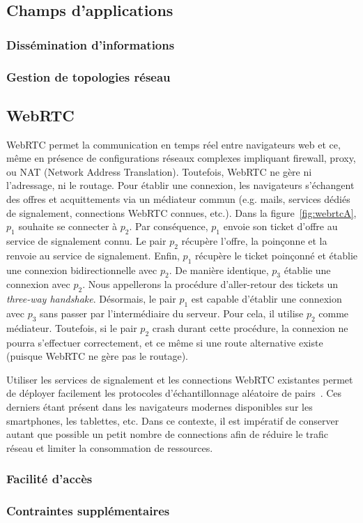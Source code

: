 \subsection{Champs d'applications}

\subsubsection{Dissémination d'informations}
\subsubsection{Gestion de topologies réseau}

\subsection{WebRTC}

WebRTC permet la communication en temps réel entre navigateurs web et ce, même
en présence de configurations réseaux complexes impliquant firewall, proxy, ou
NAT (Network Address Translation). Toutefois, WebRTC ne gère ni l'adressage, ni
le routage. Pour établir une connexion, les navigateurs s'échangent des offres
et acquittements via un médiateur commun (e.g. mails, services dédiés de
signalement, connections WebRTC connues, etc.). Dans la
figure~\ref{fig:webrtcA}, $p_1$ souhaite se connecter à $p_2$. Par conséquence,
$p_1$ envoie son ticket d'offre au service de signalement connu. Le pair $p_2$
récupère l'offre, la poinçonne et la renvoie au service de signalement. Enfin,
$p_1$ récupère le ticket poinçonné et établie une connexion bidirectionnelle
avec $p_2$. De manière identique, $p_3$ établie une connexion avec $p_2$. Nous
appellerons la procédure d'aller-retour des tickets un \emph{three-way
  handshake}. Désormais, le pair $p_1$ est capable d'établir une connexion avec
$p_3$ sans passer par l'intermédiaire du serveur. Pour cela, il utilise $p_2$
comme médiateur. Toutefois, si le pair $p_2$ crash durant cette procédure, la
connexion ne pourra s'effectuer correctement, et ce même si une route
alternative existe (puisque WebRTC ne gère pas le routage).

Utiliser les services de signalement et les connections WebRTC existantes permet
de déployer facilement les protocoles d'échantillonnage aléatoire de
pairs~\cite{jelasity2007gossip}. Ces derniers étant présent dans les navigateurs
modernes disponibles sur les smartphones, les tablettes, etc. Dans ce contexte,
il est impératif de conserver autant que possible un petit nombre de connections
afin de réduire le trafic réseau et limiter la consommation de ressources.


\subsubsection{Facilité d'accès}
\subsubsection{Contraintes supplémentaires}



